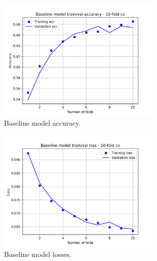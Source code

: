 \begin{figure}
\centering
\includegraphics[width=0.7\textwidth]{./TeX_files/img/baselinemodelacc.png}
\caption{Baseline model accuracy.}
\label{fig:baselinemodelacc}
\end{figure}

\begin{figure}
\centering
\includegraphics[width=0.7\textwidth]{./TeX_files/img/baselinemodelloss.png}
\caption{Baseline model losses.}
\label{fig:baselinemodelloss}
\end{figure}

